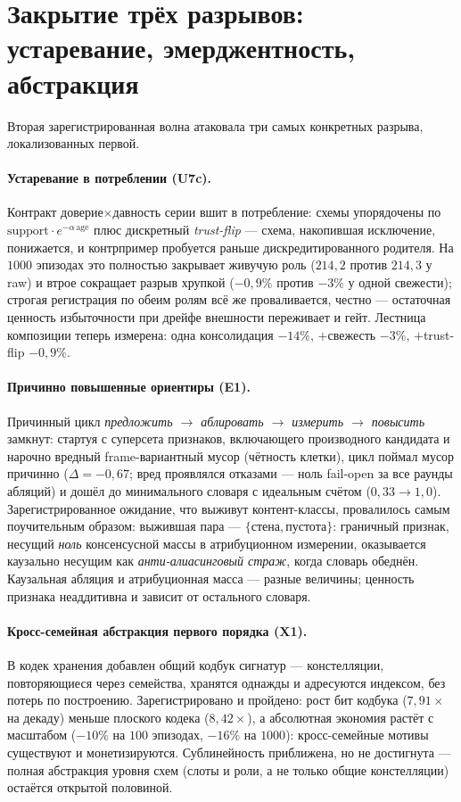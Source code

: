 \documentclass{article}
\begin{document}
\section{Закрытие трёх разрывов: устаревание, эмерджентность, абстракция}
\label{p5:sec:gaps}

Вторая зарегистрированная волна атаковала три самых конкретных
разрыва, локализованных первой.

\paragraph{Устаревание в потреблении (U7c).} Контракт
доверие$\times$давность серии вшит в потребление: схемы упорядочены
по $\text{support}\cdot e^{-\alpha\,\text{age}}$ плюс дискретный
\emph{trust-flip} --- схема, накопившая исключение, понижается, и
контрпример пробуется раньше дискредитированного родителя. На $1000$
эпизодах это полностью закрывает живучую роль ($214{,}2$ против
$214{,}3$ у raw) и втрое сокращает разрыв хрупкой ($-0{,}9\%$ против
$-3\%$ у одной свежести); строгая регистрация по обеим ролям всё же
проваливается, честно --- остаточная ценность избыточности при дрейфе
внешности переживает и гейт. Лестница композиции теперь измерена:
одна консолидация $-14\%$, $+$свежесть $-3\%$, $+$trust-flip
$-0{,}9\%$.

\paragraph{Причинно повышенные ориентиры (E1).} Причинный цикл
\emph{предложить $\to$ аблировать $\to$ измерить $\to$ повысить}
замкнут: стартуя с суперсета признаков, включающего производного
кандидата и нарочно вредный frame-вариантный мусор (чётность клетки),
цикл поймал мусор причинно ($\Delta = -0{,}67$; вред проявлялся
отказами --- ноль fail-open за все раунды абляций) и дошёл до
минимального словаря с идеальным счётом ($0{,}33 \to 1{,}0$).
Зарегистрированное ожидание, что выживут контент-классы, провалилось
самым поучительным образом: выжившая пара --- $\{\texttt{стена},
\texttt{пустота}\}$: граничный признак, несущий \emph{ноль}
консенсусной массы в атрибуционном измерении, оказывается каузально
несущим как \emph{анти-алиасинговый страж}, когда словарь обеднён.
Каузальная абляция и атрибуционная масса --- разные величины;
ценность признака неаддитивна и зависит от остального словаря.

\paragraph{Кросс-семейная абстракция первого порядка (X1).} В кодек
хранения добавлен общий кодбук сигнатур --- констелляции,
повторяющиеся через семейства, хранятся однажды и адресуются
индексом, без потерь по построению. Зарегистрировано и пройдено: рост
бит кодбука ($7{,}91\times$ на декаду) меньше плоского кодека
($8{,}42\times$), а абсолютная экономия растёт с масштабом
($-10\%$ на $100$ эпизодах, $-16\%$ на $1000$): кросс-семейные мотивы
существуют и монетизируются. Сублинейность приближена, но не
достигнута --- полная абстракция уровня схем (слоты и роли, а не
только общие констелляции) остаётся открытой половиной.
\end{document}
